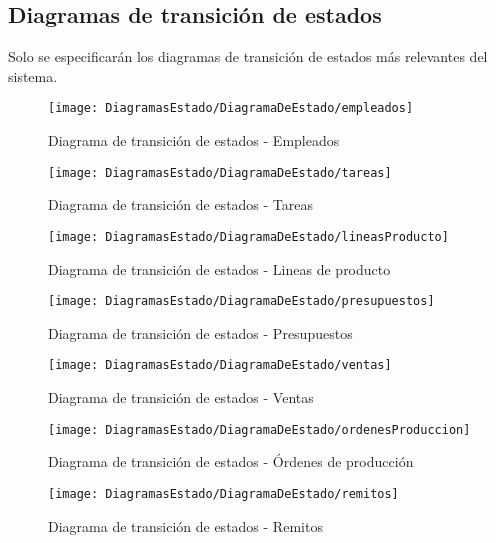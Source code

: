 	

	\clearpage %
	\subsection{Diagramas de transición de estados}
	Solo se especificarán los diagramas de transición de estados más relevantes del sistema.
	\begin{figure}[H]
		\centering
		\texttt{[image: DiagramasEstado/DiagramaDeEstado/empleados]}
		\caption{Diagrama de transición de estados - Empleados}
		\label{fig:Diagrama de transición de estados - Empleados}
	\end{figure}
	\begin{figure}[H]
		\centering
		\texttt{[image: DiagramasEstado/DiagramaDeEstado/tareas]}
		\caption{Diagrama de transición de estados - Tareas}
		\label{fig:Diagrama de transición de estados - Tareas}
	\end{figure}
	\begin{figure}[H]
		\centering
		\texttt{[image: DiagramasEstado/DiagramaDeEstado/lineasProducto]}
		\caption{Diagrama de transición de estados - Lineas de producto}
		\label{fig:Diagrama de transición de estados - Lineas de producto}
	\end{figure}
	\begin{figure}[H]
		\centering
		\texttt{[image: DiagramasEstado/DiagramaDeEstado/presupuestos]}
		\caption{Diagrama de transición de estados - Presupuestos}
		\label{fig:Diagrama de transición de estados - Presupuestos}
	\end{figure}
	\begin{figure}[H]
		\centering
		\texttt{[image: DiagramasEstado/DiagramaDeEstado/ventas]}
		\caption{Diagrama de transición de estados - Ventas}
		\label{fig:Diagrama de transición de estados - Ventas}
	\end{figure}
	\begin{figure}[H]
		\centering
		\texttt{[image: DiagramasEstado/DiagramaDeEstado/ordenesProduccion]}
		\caption{Diagrama de transición de estados - Órdenes de producción}
		\label{fig:Diagrama de transición de estados - Órdenes de producción}
	\end{figure}
	\begin{figure}[H]
		\centering
		\texttt{[image: DiagramasEstado/DiagramaDeEstado/remitos]}
		\caption{Diagrama de transición de estados - Remitos}
		\label{fig:Diagrama de transición de estados - Remitos}
	\end{figure}

